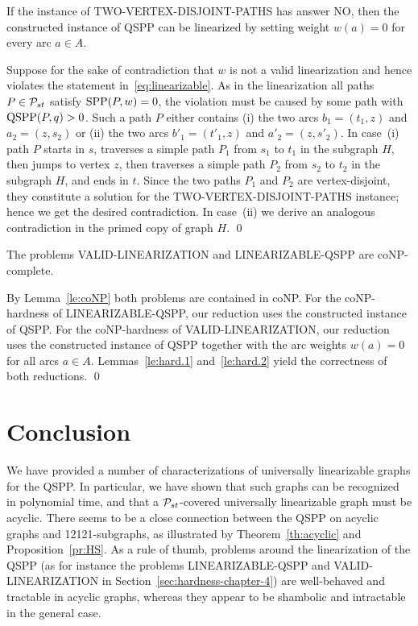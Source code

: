 \begin{lemma}
\label{le:hard.2} 
If the instance of TWO-VERTEX-DISJOINT-PATHS has answer NO,
then the constructed instance of QSPP can be linearized by setting weight $w(a)=0$ for every arc $a\in A$.
\end{lemma}
\proof
Suppose for the sake of contradiction that $w$ is not a valid linearization and hence 
violates the statement in~\eqref{eq:linearizable}.
As in the linearization all paths $P\in{\cal P}_{st}$ satisfy $\text{SPP}(P,w)=0$, the violation must
be caused by some path with $\text{QSPP}(P,q)>0$.
Such a path $P$ either contains (i) the two arcs $b_1=(t_1,z)$ and $a_2=(z,s_2)$ or 
(ii) the two arcs $b'_1=(t'_1,z)$ and $a'_2=(z,s'_2)$.
In case~(i) path $P$ starts in $s$, traverses a simple path $P_1$ from $s_1$ to $t_1$ 
in the subgraph $H$, then jumps to vertex $z$, then traverses a simple path $P_2$ from 
$s_2$ to $t_2$ in the subgraph $H$, and ends in $t$.
Since the two paths $P_1$ and $P_2$ are vertex-disjoint, they constitute a solution for 
the TWO-VERTEX-DISJOINT-PATHS instance; hence we get the desired contradiction.
In case~(ii) we derive an analogous contradiction in the primed copy of graph $H$.
\qed

\begin{theorem}
\label{th:hard}
The problems VALID-LINEARIZATION and LINEARIZABLE-QSPP are coNP-complete.
\end{theorem}
\proof
By Lemma~\ref{le:coNP} both problems are contained in coNP.
For the coNP-hardness of LINEARIZABLE-QSPP, our reduction uses the constructed instance of QSPP.
For the coNP-hardness of VALID-LINEARIZATION, our reduction uses the constructed instance of QSPP
together with the arc weights $w(a)=0$ for all arcs $a\in A$.
Lemmas~\ref{le:hard.1} and~\ref{le:hard.2} yield the correctness of both reductions.
\qed


\medskip
\section{Conclusion}
\label{sec:conclusion-chapter-4}
We have provided a number of characterizations of universally linearizable graphs for the QSPP.
In particular, we have shown that such graphs can be recognized in polynomial time,
and that a ${\cal P}_{st}$-covered universally linearizable graph must be acyclic. 
There seems to be a close connection between the QSPP on acyclic graphs and 12121-subgraphs,
as illustrated by Theorem~\ref{th:acyclic} and Proposition~\ref{pr:HS}.
As a rule of thumb, problems around the linearization of the QSPP (as for instance 
the problems LINEARIZABLE-QSPP and VALID-LINEARIZATION in Section~\ref{sec:hardness-chapter-4}) 
are well-behaved and tractable in acyclic graphs, whereas they appear to be shambolic 
and intractable in the general case.

